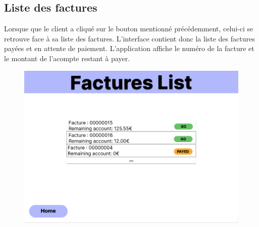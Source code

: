 \subsection{Liste des factures}
\begin{flushleft}
Lorsque que le client a cliqué sur le bouton mentionné précédemment, celui-ci se retrouve face à sa liste des factures. L'interface contient donc la liste des factures payées et en attente de paiement. L'application affiche le numéro de la facture et le montant de l'acompte restant à payer.
\end{flushleft}
\begin{figure}[h]
\centering
\includegraphics[width = 1\textwidth]{extension-maxime/interface/img/list.png}
\end{figure}

